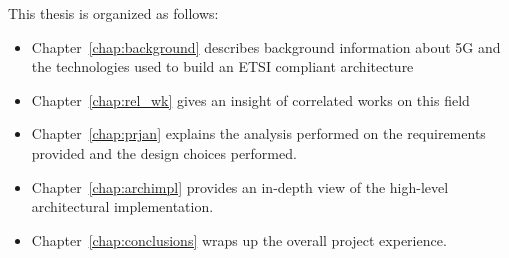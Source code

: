This thesis is organized as follows:
\begin{itemize}
 \item Chapter~\ref{chap:background} describes background information about 5G 
and the technologies used to build an ETSI compliant architecture
 \item Chapter~\ref{chap:rel_wk} gives an insight of correlated works on this 
field
 \item Chapter~\ref{chap:prjan} explains the analysis performed on the 
requirements provided and the design choices performed.
 \item Chapter~\ref{chap:archimpl} provides an in-depth view of the 
high-level architectural implementation.
 \item Chapter~\ref{chap:conclusions} wraps up the overall project experience.
\end{itemize}
